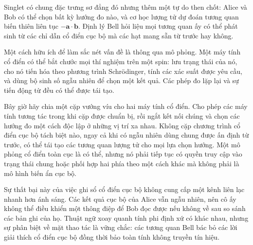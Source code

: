 Singlet có chung đặc trưng sơ đẳng đó nhưng thêm một tự do then chốt: Alice và Bob có thể chọn bất kỳ hướng đo nào, và cơ học lượng tử dự đoán tương quan biến thiên liên tục \(-\bm a\cdot\bm b\). Định lý Bell hỏi liệu mọi tương quan ấy có thể phát sinh từ các chỉ dẫn cổ điển cục bộ mà các hạt mang sẵn từ trước hay không.

\begin{classroomqa}
\end{classroomqa}

\begin{classroomqa}
\end{classroomqa}

Một cách hữu ích để làm sắc nét vấn đề là thông qua mô phỏng. Một máy tính cổ điển có thể bắt chước mọi thí nghiệm trên một spin: lưu trạng thái của nó, cho nó tiến hóa theo phương trình Schr\"odinger, tính các xác suất được yêu cầu, và dùng bộ sinh số ngẫu nhiên để chọn một kết quả. Các phép đo lặp lại và sự tiến động từ đều có thể được tái tạo.

Bây giờ hãy chia một cặp vướng víu cho hai máy tính cổ điển. Cho phép các máy tính tương tác trong khi cặp được chuẩn bị, rồi ngắt kết nối chúng và chọn các hướng đo một cách độc lập ở những vị trí xa nhau. Không cặp chương trình cổ điển cục bộ tách biệt nào, ngay cả khi có ngẫu nhiên dùng chung được ấn định từ trước, có thể tái tạo các tương quan lượng tử cho mọi lựa chọn hướng. Một mô phỏng cổ điển toàn cục là có thể, nhưng nó phải tiếp tục có quyền truy cập vào trạng thái chung hoặc phối hợp hai phía theo một cách khác mà không phải là mô hình biến ẩn cục bộ.

Sự thất bại này của việc ghi sổ cổ điển cục bộ không cung cấp một kênh liên lạc nhanh hơn ánh sáng. Các kết quả cục bộ của Alice vẫn ngẫu nhiên, nên cô ấy không thể điều khiển một thông điệp để Bob đọc được nếu không về sau so sánh các bản ghi của họ. Thuật ngữ xoay quanh tính phi định xứ có khác nhau, nhưng sự phân biệt về mặt thao tác là vững chắc: các tương quan Bell bác bỏ các lời giải thích cổ điển cục bộ đồng thời bảo toàn tính không truyền tín hiệu.

